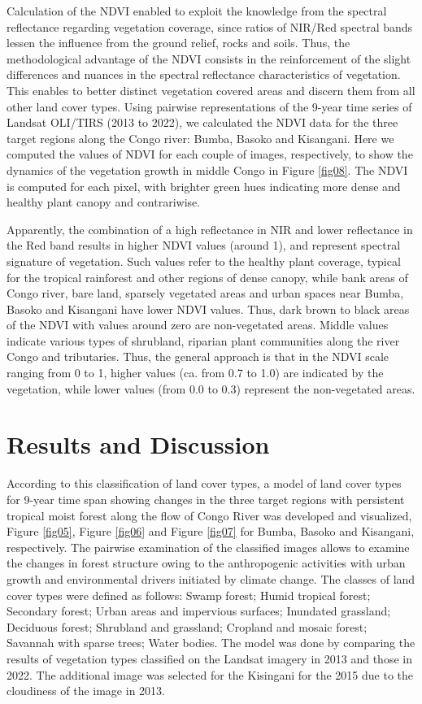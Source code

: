 \documentclass[applsci,article,submit,pdftex,moreauthors]{Definitions/mdpi}
\begin{document}
Calculation of the NDVI enabled to exploit the knowledge from the spectral reflectance regarding vegetation coverage, since ratios of NIR/Red spectral bands lessen the influence from the ground relief, rocks and soils. Thus, the methodological advantage of the NDVI consists in the reinforcement of the slight differences and nuances in the spectral reflectance characteristics of vegetation. This enables to better distinct vegetation covered areas and discern them from all other land cover types. Using pairwise representations of the 9-year time series of Landsat OLI/TIRS (2013 to 2022), we calculated the NDVI data for the three target regions along the Congo river: Bumba, Basoko and Kisangani. Here we computed the values of NDVI for each couple of images, respectively, to show the dynamics of the vegetation growth in middle Congo in Figure \ref{fig08}. The NDVI is computed for each pixel, with brighter green hues indicating more dense and healthy plant canopy and contrariwise. 

Apparently, the combination of a high reflectance in NIR and lower reflectance in the Red band results in higher NDVI values (around 1), and represent spectral signature of vegetation. Such values refer to the healthy plant coverage, typical for the tropical rainforest and other regions of dense canopy, while bank areas of Congo river, bare land, sparsely vegetated areas and urban spaces near Bumba, Basoko and Kisangani have lower NDVI values. Thus, dark brown to black areas of the NDVI with values around zero are non-vegetated areas. Middle values indicate various types of shrubland, riparian plant communities along the river Congo and tributaries. Thus, the general approach is that in the NDVI scale ranging from 0 to 1, higher values (ca. from 0.7 to 1.0) are indicated by the vegetation, while lower values (from 0.0 to 0.3) represent the non-vegetated areas. 

\section{Results and Discussion}

According to this classification of land cover types, a model of land cover types for 9-year time span showing changes in the three target regions with persistent tropical moist forest along the flow of Congo River was developed and visualized, Figure \ref{fig05}, Figure \ref{fig06} and Figure \ref{fig07} for Bumba, Basoko and Kisangani, respectively. The pairwise examination of the classified images allows to examine the changes in forest structure owing to the anthropogenic activities with urban growth and environmental drivers initiated by climate change. The classes of land cover types were defined as follows: Swamp forest; Humid tropical forest; Secondary forest; Urban areas and impervious surfaces; Inundated grassland; Deciduous forest; Shrubland and grassland; Cropland and mosaic forest; Savannah with sparse trees; Water bodies. The model was done by comparing the results of vegetation types classified on the Landsat imagery in 2013 and those in 2022. The additional image was selected for the Kisingani for the 2015 due to the cloudiness of the image in 2013.
\end{document}
